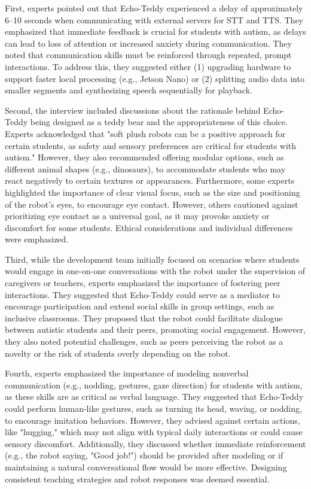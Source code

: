 First, experts pointed out that Echo-Teddy experienced a delay of approximately 6–10 seconds when communicating with external servers for STT and TTS. They emphasized that immediate feedback is crucial for students with autism, as delays can lead to loss of attention or increased anxiety during communication. They noted that communication skills must be reinforced through repeated, prompt interactions. To address this, they suggested either (1) upgrading hardware to support faster local processing (e.g., Jetson Nano) or (2) splitting audio data into smaller segments and synthesizing speech sequentially for playback.

Second, the interview included discussions about the rationale behind Echo-Teddy being designed as a teddy bear and the appropriateness of this choice. Experts acknowledged that "soft plush robots can be a positive approach for certain students, as safety and sensory preferences are critical for students with autism." However, they also recommended offering modular options, such as different animal shapes (e.g., dinosaurs), to accommodate students who may react negatively to certain textures or appearances. Furthermore, some experts highlighted the importance of clear visual focus, such as the size and positioning of the robot’s eyes, to encourage eye contact. However, others cautioned against prioritizing eye contact as a universal goal, as it may provoke anxiety or discomfort for some students. Ethical considerations and individual differences were emphasized.

Third, while the development team initially focused on scenarios where students would engage in one-on-one conversations with the robot under the supervision of caregivers or teachers, experts emphasized the importance of fostering peer interactions. They suggested that Echo-Teddy could serve as a mediator to encourage participation and extend social skills in group settings, such as inclusive classrooms. They proposed that the robot could facilitate dialogue between autistic students and their peers, promoting social engagement. However, they also noted potential challenges, such as peers perceiving the robot as a novelty or the risk of students overly depending on the robot.

Fourth, experts emphasized the importance of modeling nonverbal communication (e.g., nodding, gestures, gaze direction) for students with autism, as these skills are as critical as verbal language. They suggested that Echo-Teddy could perform human-like gestures, such as turning its head, waving, or nodding, to encourage imitation behaviors. However, they advised against certain actions, like "hugging," which may not align with typical daily interactions or could cause sensory discomfort. Additionally, they discussed whether immediate reinforcement (e.g., the robot saying, "Good job!") should be provided after modeling or if maintaining a natural conversational flow would be more effective. Designing consistent teaching strategies and robot responses was deemed essential.

